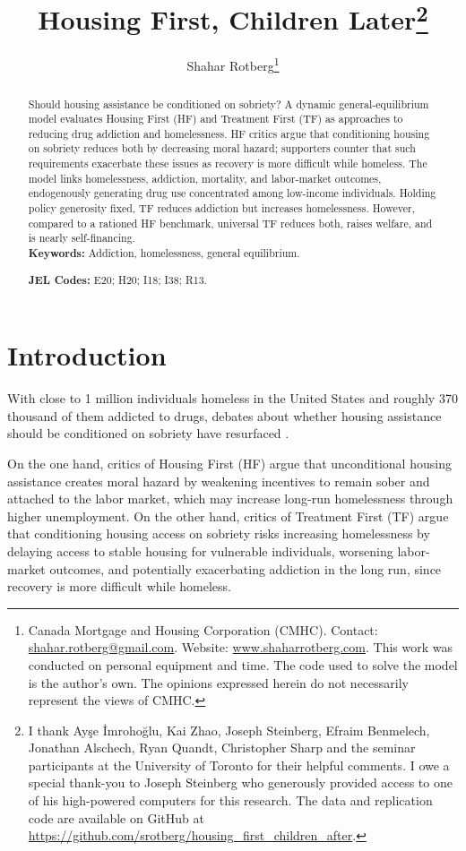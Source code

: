\documentclass[parskip=full]{article}
\title{\vspace{-1.8cm}Housing First, Children Later\footnote{I thank Ay\c{s}e \.{I}mroho\u{g}lu, Kai Zhao, Joseph Steinberg, Efraim Benmelech, Jonathan Alschech, Ryan Quandt, Christopher Sharp and the seminar participants at the University of Toronto for their helpful comments. I owe a special thank-you to Joseph Steinberg who generously provided access to one of his high-powered computers for this research. The data and replication code are available on GitHub at \url{https://github.com/srotberg/housing_first_children_after}.}}
\author{Shahar Rotberg\footnote{Canada Mortgage and Housing Corporation (CMHC). Contact: \url{shahar.rotberg@gmail.com}. Website: \url{www.shaharrotberg.com}. This work was conducted on personal equipment and time. The code used to solve the model is the author's own. The opinions expressed herein do not necessarily represent the views of CMHC.}}
\theoremstyle{plain}
\theoremstyle{definition}
\theoremstyle{remark}
\begin{document}
\maketitle

\begin{abstract}
\onehalfspacing
\noindent

\noindent Should housing assistance be conditioned on sobriety? A dynamic general-equilibrium model evaluates Housing First (HF) and Treatment First (TF) as approaches to reducing drug addiction and homelessness. HF critics argue that conditioning housing on sobriety reduces both by decreasing moral hazard; supporters counter that such requirements exacerbate these issues as recovery is more difficult while homeless. The model links homelessness, addiction, mortality, and labor-market outcomes, endogenously generating drug use concentrated among low-income individuals. Holding policy generosity fixed, TF reduces addiction but increases homelessness. However, compared to a rationed HF benchmark, universal TF reduces both, raises welfare, and is nearly self-financing.\\[1.5ex]


\noindent \textbf{Keywords:} Addiction, homelessness, general equilibrium. 

\noindent \textbf{JEL Codes:} E20; H20; I18; I38; R13. 

\end{abstract}

\section{Introduction}\label{sec:intro}

With close to 1 million individuals homeless in the United States and roughly 370 thousand of them addicted to drugs, debates about whether housing assistance should be conditioned on sobriety have resurfaced \citep{cityjournal_trump_homelessness,kqed_trump_homelessness}.

On the one hand, critics of Housing First (HF) argue that unconditional housing assistance creates moral hazard by weakening incentives to remain sober and attached to the labor market, which may increase long-run homelessness through higher unemployment. On the other hand, critics of Treatment First (TF) argue that conditioning housing access on sobriety risks increasing homelessness by delaying access to stable housing for vulnerable individuals, worsening labor-market outcomes, and potentially exacerbating addiction in the long run, since recovery is more difficult while homeless.
\end{document}
